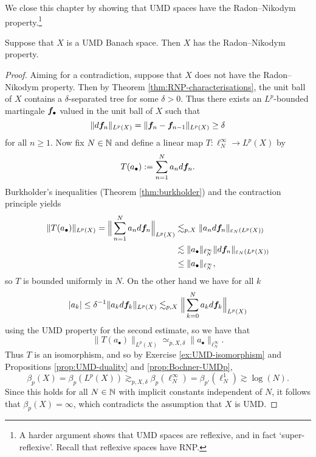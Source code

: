 We close this chapter by showing that UMD spaces have the Radon--Nikodym property.\footnote{A harder argument shows that UMD spaces are reflexive, and in fact `super-reflexive'. Recall that reflexive spaces have RNP.}

\begin{thm}
  Suppose that $X$ is a UMD Banach space.
  Then $X$ has the Radon--Nikodym property.
\end{thm}

\begin{proof}
  Aiming for a contradiction, suppose that $X$ does not have the Radon--Nikodym property.
  Then by Theorem \ref{thm:RNP-characterisations}, the unit ball of $X$ contains a $\delta$-separated tree for some $\delta > 0$.
  Thus there exists an $L^p$-bounded martingale $\bm{f}_{\bullet}$ valued in the unit ball of $X$ such that
  \begin{equation*}
    \|d\bm{f}_{n}\|_{L^p(X)} = \|\bm{f}_{n} - \bm{f}_{n-1}\|_{L^p(X)} \geq \delta
  \end{equation*}
  for all $n \geq 1$.
  Now fix $N \in \mathbb{N}$ and define a linear map $T \colon \ell^\infty_N \to L^p(X)$ by
  \begin{equation*}
    T(a_{\bullet}) := \sum_{n=1}^{N} a_{n} d\bm{f}_{n}.
  \end{equation*}
  Burkholder's inequalities (Theorem \ref{thm:burkholder}) and the contraction principle yields
  \begin{equation*}
    \begin{aligned}
    \|T(a_{\bullet})\|_{L^p(X)} = \Big\| \sum_{n=1}^{N} a_{n} d\bm{f}_{n} \Big\|_{L^p(X)}
    &\lesssim_{p,X} \|a_{n} d\bm{f}_{n}\|_{\varepsilon_{N}(L^p(X))} \\
    &\lesssim \|a_{\bullet}\|_{\ell^{\infty}_{N}} \|d\bm{f}_{n}\|_{\varepsilon_{N}(L^p(X))} \\
    &\leq \|a_{\bullet}\|_{\ell^{\infty}_{N}},
  \end{aligned}
\end{equation*}
so $T$ is bounded uniformly in $N$.
On the other hand we have for all $k$ 
\begin{equation*}
  |a_{k}| \leq \delta^{-1} \|a_{k} d\bm{f}_{k}\|_{L^p(X)} \lesssim_{p,X} \Big\| \sum_{k = 0}^{N} a_{k} d\bm{f}_{k}\Big\|_{L^p(X)}
\end{equation*}
using the UMD property for the second estimate, so we have that
\begin{equation*}
  \|T(a_{\bullet})\|_{L^p(X)} \simeq_{p,X,\delta} \|a_{\bullet}\|_{\ell^\infty_{N}}.
\end{equation*}
Thus $T$ is an isomorphism, and so by Exercise \ref{ex:UMD-isomorphism} and Propositions \ref{prop:UMD-duality} and \ref{prop:Bochner-UMDp},
\begin{equation*}
  \beta_{p}(X) = \beta_{p}(L^p(X)) \gtrsim_{p,X,\delta} \beta_{p}(\ell^\infty_N) = \beta_{p'}(\ell^1_N) \gtrsim \log(N).
\end{equation*}
Since this holds for all $N \in \mathbb{N}$ with implicit constants independent of $N$, it follows that $\beta_{p}(X) = \infty$, which contradicts the assumption that $X$ is UMD.
\end{proof}

